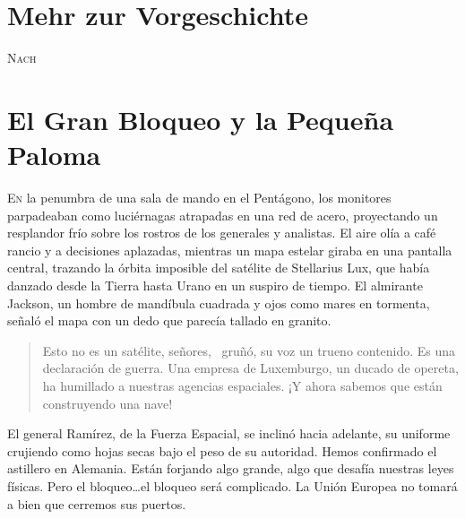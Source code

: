 


\chapter*{Mehr zur Vorgeschichte}


\lettrine[lines=2, loversize=0.3, lraise=0]{\initfamily N}{ach }

\chapter{El Gran Bloqueo y la Pequeña Paloma}

\lettrine[lines=2, loversize=0.3, lraise=0]{E}{n} la penumbra de una sala de mando en el Pentágono, los monitores parpadeaban como luciérnagas atrapadas en una red de acero, proyectando un resplandor frío sobre los rostros de los generales y analistas. El aire olía a café rancio y a decisiones aplazadas, mientras un mapa estelar giraba en una pantalla central, trazando la órbita imposible del satélite de Stellarius Lux, que había danzado desde la Tierra hasta Urano en un suspiro de tiempo. El almirante Jackson, un hombre de mandíbula cuadrada y ojos como mares en tormenta, señaló el mapa con un dedo que parecía tallado en granito.

\begin{quote}
\calli
\glqq Esto no es un satélite, señores,\grqq~ gruñó, su voz un trueno contenido. \glqq Es una declaración de guerra. Una empresa de Luxemburgo, un ducado de opereta, ha humillado a nuestras agencias espaciales. ¡Y ahora sabemos que están construyendo una nave!\grqq
\end{quote}

El general Ramírez, de la Fuerza Espacial, se inclinó hacia adelante, su uniforme crujiendo como hojas secas bajo el peso de su autoridad. \glqq Hemos confirmado el astillero en Alemania. Están forjando algo grande, algo que desafía nuestras leyes físicas. Pero el bloqueo\ldots el bloqueo será complicado. La Unión Europea no tomará a bien que cerremos sus puertos.\grqq

